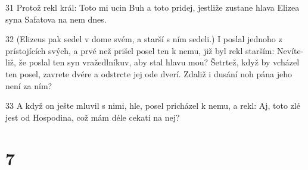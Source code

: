 \par 31 Protož rekl král: Toto mi ucin Buh a toto pridej, jestliže zustane hlava Elizea syna Safatova na nem dnes.
\par 32 (Elizeus pak sedel v dome svém, a starší s ním sedeli.) I poslal jednoho z prístojících svých, a prvé než prišel posel ten k nemu, již byl rekl starším: Nevíte-liž, že poslal ten syn vražedlníkuv, aby stal hlavu mou? Šetrtež, když by vcházel ten posel, zavrete dvére a odstrcte jej ode dverí. Zdaliž i dusání noh pána jeho není za ním?
\par 33 A když on ješte mluvil s nimi, hle, posel pricházel k nemu, a rekl: Aj, toto zlé jest od Hospodina, což mám déle cekati na nej?

\chapter{7}

